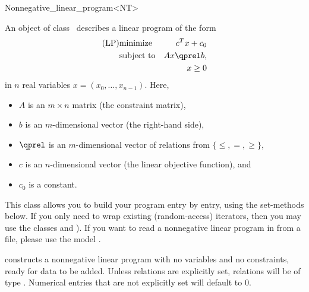 \begin{ccRefClass}{Nonnegative_linear_program<NT>}


\ccDefinition
An object of class \ccRefName\ describes a linear program of the form
\begin{eqnarray*}
\mbox{(LP)}& \mbox{minimize} & c^{T}x+c_0 \\
&\mbox{subject to}   & Ax\qprel b, \\
&                    & x \geq 0
\end{eqnarray*}
in $n$ real variables $x=(x_0,\ldots,x_{n-1})$.
Here, 
\begin{itemize}
\item $A$ is an $m\times n$ matrix (the constraint matrix), 
\item $b$ is an $m$-dimensional vector (the right-hand side),
\item $\qprel$ is an $m$-dimensional vector of relations 
from $\{\leq, =, \geq\}$, 
\item $c$ is an $n$-dimensional vector (the linear objective
  function), and 
\item $c_0$ is a constant.
\end{itemize}

This class allows you to build your program entry by entry, using
the set-methods below. If you only need to wrap existing (random-access)
iterators, then you may use the classes 
 and ). 
If you want to read a nonnegative linear program in  from a 
file, please use the model .

\ccIsModel
{}

\ccTypes


\ccCreation
\ccIndexClassCreation
{}

{constructs a nonnegative
linear program with no variables and no constraints, ready
for data to be added. Unless relations are explicitly set, 
relations will be of type . 
Numerical entries that are not explicitly set will default to $0$.}

\ccOperations


\end{ccRefClass}
